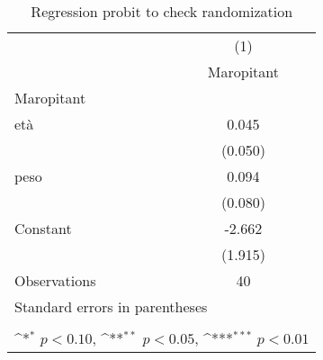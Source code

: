 \begin{table}[htbp]\centering
\def\sym#1{\ifmmode^{#1}\else\(^{#1}\)\fi}
\caption{Regression probit to check randomization}
\begin{tabular}{l*{1}{c}}
\toprule
                    &\multicolumn{1}{c}{(1)}\\
                    &\multicolumn{1}{c}{Maropitant}\\
\midrule
Maropitant          &                     \\
età                 &       0.045         \\
                    &     (0.050)         \\
\addlinespace
peso                &       0.094         \\
                    &     (0.080)         \\
\addlinespace
Constant            &      -2.662         \\
                    &     (1.915)         \\
\midrule
Observations        &          40         \\
\bottomrule
\multicolumn{2}{l}{\footnotesize Standard errors in parentheses}\\
\multicolumn{2}{l}{\footnotesize  }\\
\multicolumn{2}{l}{\footnotesize \sym{*} \(p<0.10\), \sym{**} \(p<0.05\), \sym{***} \(p<0.01\)}\\
\end{tabular}
\end{table}
